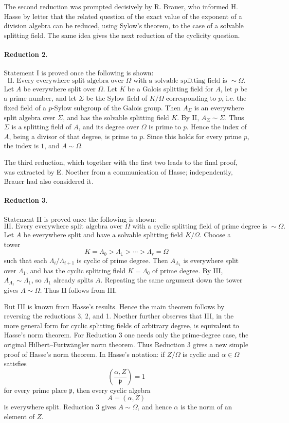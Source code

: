 \documentclass[11pt]{article}
\providecommand{\Om}{\Omega}
\begin{document}
The second reduction was prompted decisively by R. Brauer, who informed H. Hasse by letter that the related question of the exact value of the exponent of a division algebra can be reduced, using Sylow's theorem, to the case of a solvable splitting field. The same idea gives the next reduction of the cyclicity question.

\paragraph{Reduction 2.}
Statement I is proved once the following is shown:
\[
\text{II. Every everywhere split algebra over }\Om\text{ with a solvable splitting field is } \sim\Om .
\]
Let \(A\) be everywhere split over \(\Om\). Let \(K\) be a Galois splitting field for \(A\), let \(p\) be a prime number, and let \(\Sigma\) be the Sylow field of \(K/\Om\) corresponding to \(p\), i.e. the fixed field of a \(p\)-Sylow subgroup of the Galois group. Then \(A_\Sigma\) is an everywhere split algebra over \(\Sigma\), and has the solvable splitting field \(K\). By II, \(A_\Sigma\sim\Sigma\). Thus \(\Sigma\) is a splitting field of \(A\), and its degree over \(\Om\) is prime to \(p\). Hence the index of \(A\), being a divisor of that degree, is prime to \(p\). Since this holds for every prime \(p\), the index is \(1\), and \(A\sim\Om\).

The third reduction, which together with the first two leads to the final proof, was extracted by E. Noether from a communication of Hasse; independently, Brauer had also considered it.

\paragraph{Reduction 3.}
Statement II is proved once the following is shown:
\[
\text{III. Every everywhere split algebra over }\Om\text{ with a cyclic splitting field of prime degree is } \sim\Om .
\]
Let \(A\) be everywhere split and have a solvable splitting field \(K/\Om\). Choose a tower
\[
        K=\Lambda_0>\Lambda_1>\cdots>\Lambda_r=\Om
\]
such that each \(\Lambda_i/\Lambda_{i+1}\) is cyclic of prime degree. Then \(A_{\Lambda_1}\) is everywhere split over \(\Lambda_1\), and has the cyclic splitting field \(K=\Lambda_0\) of prime degree. By III, \(A_{\Lambda_1}\sim\Lambda_1\), so \(\Lambda_1\) already splits \(A\). Repeating the same argument down the tower gives \(A\sim\Om\). Thus II follows from III.

But III is known from Hasse's results. Hence the main theorem follows by reversing the reductions 3, 2, and 1. Noether further observes that III, in the more general form for cyclic splitting fields of arbitrary degree, is equivalent to Hasse's norm theorem. For Reduction 3 one needs only the prime-degree case, the original Hilbert--Furtwängler norm theorem. Thus Reduction 3 gives a new simple proof of Hasse's norm theorem. In Hasse's notation: if \(Z/\Om\) is cyclic and \(\alpha\in\Om\) satisfies
\[
        \left(\frac{\alpha,Z}{\mathfrak p}\right)=1
\]
for every prime place \(\mathfrak p\), then every cyclic algebra
\[
        A=(\alpha,Z)
\]
is everywhere split. Reduction 3 gives \(A\sim\Om\), and hence \(\alpha\) is the norm of an element of \(Z\).
\end{document}
